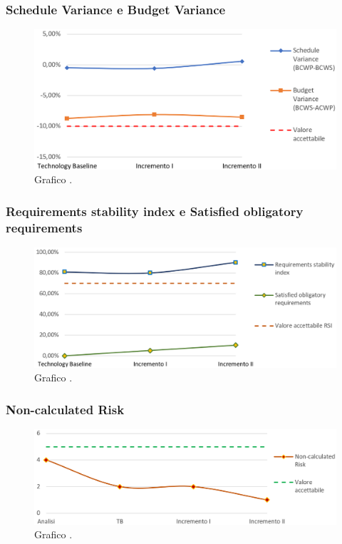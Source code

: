 \newpage

\subsubsection{Schedule Variance e Budget Variance}
\begin{figure}[h]
	\centering
	\includegraphics[width=16cm]{Images/SV-BV}
	\caption{Graﬁco .}
\end{figure}



\subsubsection{Requirements stability index e Satisﬁed obligatory requirements}
\begin{figure}[h]
	\centering
	\includegraphics[width=16cm]{Images/requisiti}
	\caption{Graﬁco .}
\end{figure}

\newpage

\subsubsection{Non-calculated Risk}
\begin{figure}[h]
	\centering
	\includegraphics[width=17cm]{Images/rischi}
	\caption{Graﬁco .}
\end{figure}



